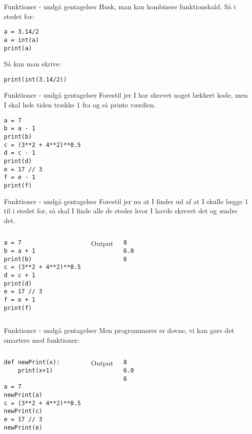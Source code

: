 \documentclass[main.tex]{subfiles}
\begin{document}
\begin{frame}[fragile]{Funktioner - undgå gentagelser}
	Husk, man kan kombinere funktionskald. Så i stedet for:
	
	\begin{lstlisting}[style=python]
a = 3.14/2
a = int(a)
print(a)
	\end{lstlisting}
	
	Så kan man skrive:
	
	\begin{lstlisting}[style=python]
print(int(3.14/2))
	\end{lstlisting}
\end{frame}

\begin{frame}[fragile]{Funktioner - undgå gentagelser}
Forestil jer I har skrevet noget lækkert kode, men I skal hele tiden trække 1 fra og så printe værdien.
\begin{lstlisting}[style=python]
a = 7
b = a - 1
print(b)
c = (3**2 + 4**2)**0.5
d = c - 1
print(d)
e = 17 // 3
f = e - 1
print(f)
\end{lstlisting}
\end{frame}

\begin{frame}[fragile]{Funktioner - undgå gentagelser}
Forestil jer nu at I finder ud af at I skulle lægge 1 til i stedet for, så skal I finde alle de steder hvor I havde skrevet det og ændre det.
\begin{columns}
	\begin{lstlisting}[style=python]
a = 7
b = a + 1
print(b)
c = (3**2 + 4**2)**0.5
d = c + 1
print(d)
e = 17 // 3
f = e + 1
print(f)
	\end{lstlisting}
	Output
	\begin{lstlisting}[style=python]
8
6.0
6
	\end{lstlisting}	
\end{columns}
\end{frame}


\begin{frame}[fragile]{Funktioner - undgå gentagelser}
Men programmører er dovne, vi kan gøre det smartere med funktioner:
\begin{columns}
	\begin{lstlisting}[style=python]
def newPrint(x):
	print(x+1)

a = 7
newPrint(a)
c = (3**2 + 4**2)**0.5
newPrint(c)
e = 17 // 3
newPrint(e)
	\end{lstlisting}
	Output
	\begin{lstlisting}[style=python]
8
6.0
6
	\end{lstlisting}	
\end{columns}
\end{frame}
\end{document}
